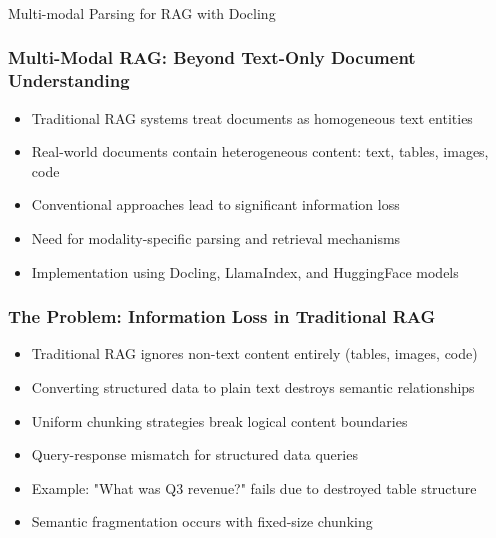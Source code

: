 \begin{frame}[fragile]\frametitle{}
\begin{center}
{\Large Multi-modal Parsing for RAG with Docling}

\end{center}
\end{frame}


\begin{frame}[fragile]\frametitle{Multi-Modal RAG: Beyond Text-Only Document Understanding}
\begin{itemize}
\item Traditional RAG systems treat documents as homogeneous text entities
\item Real-world documents contain heterogeneous content: text, tables, images, code
\item Conventional approaches lead to significant information loss
\item Need for modality-specific parsing and retrieval mechanisms
\item Implementation using Docling, LlamaIndex, and HuggingFace models
\end{itemize}
\end{frame}

\begin{frame}[fragile]\frametitle{The Problem: Information Loss in Traditional RAG}
\begin{itemize}
\item Traditional RAG ignores non-text content entirely (tables, images, code)
\item Converting structured data to plain text destroys semantic relationships
\item Uniform chunking strategies break logical content boundaries
\item Query-response mismatch for structured data queries
\item Example: "What was Q3 revenue?" fails due to destroyed table structure
\item Semantic fragmentation occurs with fixed-size chunking
\end{itemize}
\end{frame}

